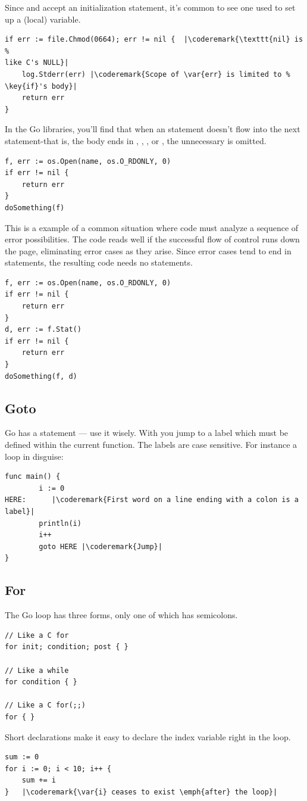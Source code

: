 Since  and  accept an initialization statement, it's common to
see one used to set up a (local) variable.
\begin{lstlisting}
if err := file.Chmod(0664); err != nil {  |\coderemark{\texttt{nil} is %
like C's NULL}|
    log.Stderr(err) |\coderemark{Scope of \var{err} is limited to %
\key{if}'s body}|
    return err
}
\end{lstlisting}
In the Go libraries, you'll find that when an  statement doesn't flow
into the next statement-that is, the body ends in ,
, ,
or , the unnecessary  is omitted.

\begin{lstlisting}
f, err := os.Open(name, os.O_RDONLY, 0)
if err != nil {
    return err
}
doSomething(f)
\end{lstlisting}
This is a example of a common situation where code must analyze a
sequence of error possibilities. The code reads well if the successful
flow of control runs down the page, eliminating error cases as they
arise. Since error cases tend to end in  statements, the resulting
code needs no  statements.
\begin{lstlisting}
f, err := os.Open(name, os.O_RDONLY, 0)
if err != nil {
    return err
}
d, err := f.Stat()
if err != nil {
    return err
}
doSomething(f, d)
\end{lstlisting}

\subsection{Goto}
Go has a  statement --- use it wisely. With 
you jump to a label which must be defined within the current function.
The labels are case sensitive. 
For instance a loop in disguise:
\begin{lstlisting}
func main() {
        i := 0                                                                                      
HERE:	   |\coderemark{First word on a line ending with a colon is a label}|
        println(i)
        i++ 
        goto HERE |\coderemark{Jump}|
}
\end{lstlisting}

\subsection{For}
The Go  loop has three forms, only one of
which has semicolons.
\begin{lstlisting}
// Like a C for
for init; condition; post { }

// Like a while
for condition { }

// Like a C for(;;)
for { }
\end{lstlisting}
Short declarations make it easy to declare the index variable right in the loop.
\begin{lstlisting}
sum := 0
for i := 0; i < 10; i++ {
    sum += i
}   |\coderemark{\var{i} ceases to exist \emph{after} the loop}|
\end{lstlisting}

